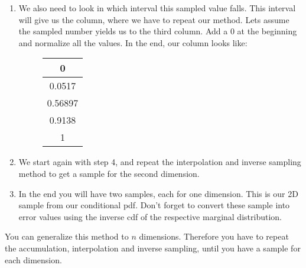 \begin{enumerate}
	\item We also need to look in which interval this sampled value falls. This interval will give us the column, where we have to repeat our method. Lets assume the sampled number yields us to the third column. Add a 0 at the beginning and normalize all the values. In the end, our column looks like:
	\begin{figure}[H]
		\centering
		\begin{tabular}{|c|}\hline
			0 \\ \hline
			0.0517 \\ \hline
			0.56897 \\ \hline
			0.9138 \\ \hline
			1 \\ \hline
		\end{tabular}
	\end{figure}
	\item We start again with step 4, and repeat the interpolation and inverse sampling method to get a sample for the second dimension.
	\item In the end you will have two samples, each for one dimension. This is our 2D sample from our conditional pdf. Don't forget to convert these sample into error values using the inverse cdf of the respective marginal distribution.
\end{enumerate}

You can generalize this method to $n$ dimensions. Therefore you have to repeat the accumulation, interpolation and inverse sampling, until you have a sample for each dimension.
		
	